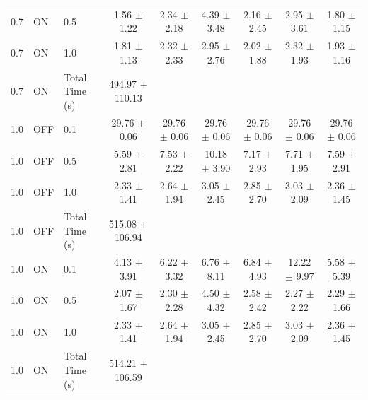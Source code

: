 \begin{table}[ht]
{\begin{tabular}{lllcccccc}
0.7 & ON & 0.5 & 1.56 $\pm$ 1.22 & 2.34 $\pm$ 2.18 & 4.39 $\pm$ 3.48 & 2.16 $\pm$ 2.45 & 2.95 $\pm$ 3.61 & 1.80 $\pm$ 1.15 \\
0.7 & ON & 1.0 & 1.81 $\pm$ 1.13 & 2.32 $\pm$ 2.33 & 2.95 $\pm$ 2.76 & 2.02 $\pm$ 1.88 & 2.32 $\pm$ 1.93 & 1.93 $\pm$ 1.16 \\
0.7 & ON & Total Time (s) & 494.97 $\pm$ 110.13 &  &  &  &  &  \\
1.0 & OFF & 0.1 & 29.76 $\pm$ 0.06 & 29.76 $\pm$ 0.06 & 29.76 $\pm$ 0.06 & 29.76 $\pm$ 0.06 & 29.76 $\pm$ 0.06 & 29.76 $\pm$ 0.06 \\
1.0 & OFF & 0.5 & 5.59 $\pm$ 2.81 & 7.53 $\pm$ 2.22 & 10.18 $\pm$ 3.90 & 7.17 $\pm$ 2.93 & 7.71 $\pm$ 1.95 & 7.59 $\pm$ 2.91 \\
1.0 & OFF & 1.0 & 2.33 $\pm$ 1.41 & 2.64 $\pm$ 1.94 & 3.05 $\pm$ 2.45 & 2.85 $\pm$ 2.70 & 3.03 $\pm$ 2.09 & 2.36 $\pm$ 1.45 \\
1.0 & OFF & Total Time (s) & 515.08 $\pm$ 106.94 &  &  &  &  &  \\
1.0 & ON & 0.1 & 4.13 $\pm$ 3.91 & 6.22 $\pm$ 3.32 & 6.76 $\pm$ 8.11 & 6.84 $\pm$ 4.93 & 12.22 $\pm$ 9.97 & 5.58 $\pm$ 5.39 \\
1.0 & ON & 0.5 & 2.07 $\pm$ 1.67 & 2.30 $\pm$ 2.28 & 4.50 $\pm$ 4.32 & 2.58 $\pm$ 2.42 & 2.27 $\pm$ 2.22 & 2.29 $\pm$ 1.66 \\
1.0 & ON & 1.0 & 2.33 $\pm$ 1.41 & 2.64 $\pm$ 1.94 & 3.05 $\pm$ 2.45 & 2.85 $\pm$ 2.70 & 3.03 $\pm$ 2.09 & 2.36 $\pm$ 1.45 \\
1.0 & ON & Total Time (s) & 514.21 $\pm$ 106.59 &  &  &  &  &  \\
\bottomrule
\end{tabular}
}
\end{table}